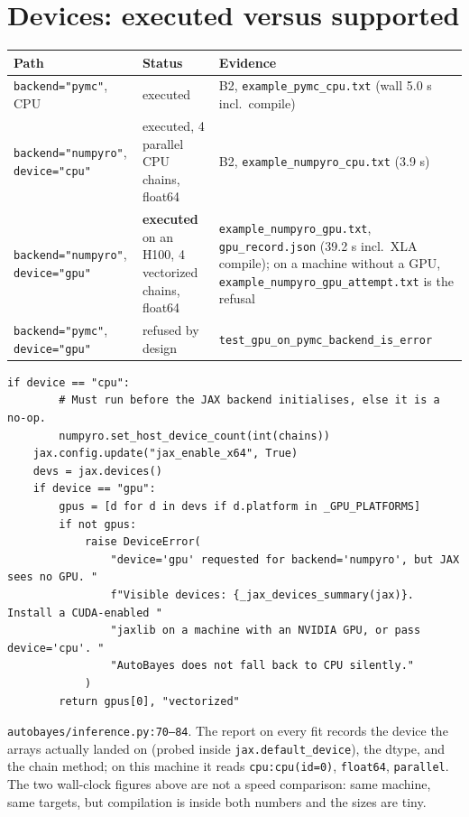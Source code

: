 \documentclass[11pt]{article}
\newcommand{\code}[1]{\texttt{#1}}
\newcommand{\file}[1]{\texttt{#1}}
\newcommand{\sbstext}[1]{\hfill\begin{minipage}[t]{0.42\textwidth}\small #1\end{minipage}}
\begin{document}
\section{Devices: executed versus supported}

\begin{center}\footnotesize
\begin{tabular}{p{}p{}p{}}
\toprule
Path & Status & Evidence \\
\midrule
\code{backend="pymc"}, CPU & executed & B2, \file{example\_pymc\_cpu.txt} (wall 5.0 s incl.\ compile) \\
\code{backend="numpyro"}, \code{device="cpu"} & executed, 4 parallel CPU chains, float64 & B2, \file{example\_numpyro\_cpu.txt} (3.9 s) \\
\code{backend="numpyro"}, \code{device="gpu"} & \textbf{executed} on an H100, 4 vectorized chains, float64 & \file{example\_numpyro\_gpu.txt}, \file{gpu\_record.json} (39.2 s incl.\ XLA compile); on a machine without a GPU, \file{example\_numpyro\_gpu\_attempt.txt} is the refusal \\
\code{backend="pymc"}, \code{device="gpu"} & refused by design & \code{test\_gpu\_on\_pymc\_backend\_is\_error} \\
\bottomrule
\end{tabular}
\end{center}

\begin{minipage}[t]{0.54\textwidth}\begin{lstlisting}[firstnumber=70]
    if device == "cpu":
        # Must run before the JAX backend initialises, else it is a no-op.
        numpyro.set_host_device_count(int(chains))
    jax.config.update("jax_enable_x64", True)
    devs = jax.devices()
    if device == "gpu":
        gpus = [d for d in devs if d.platform in _GPU_PLATFORMS]
        if not gpus:
            raise DeviceError(
                "device='gpu' requested for backend='numpyro', but JAX sees no GPU. "
                f"Visible devices: {_jax_devices_summary(jax)}. Install a CUDA-enabled "
                "jaxlib on a machine with an NVIDIA GPU, or pass device='cpu'. "
                "AutoBayes does not fall back to CPU silently."
            )
        return gpus[0], "vectorized"
\end{lstlisting}\end{minipage}
\sbstext{\file{autobayes/inference.py:70--84}. The report on every fit records the device
the arrays actually landed on (probed inside \code{jax.default\_device}), the dtype, and
the chain method; on this machine it reads \code{cpu:cpu(id=0)}, \code{float64},
\code{parallel}. The two wall-clock figures above are not a speed comparison: same
machine, same targets, but compilation is inside both numbers and the sizes are tiny.}
\end{document}

